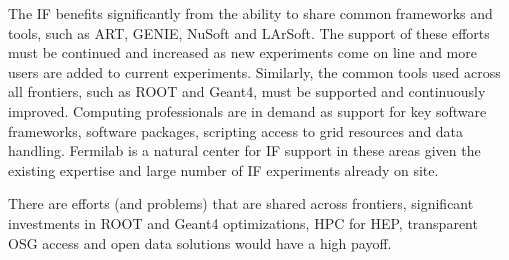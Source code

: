 The IF benefits significantly from the ability to share common frameworks and
tools, such as ART, GENIE, NuSoft and LArSoft.  The support of these efforts
must be continued and increased as new experiments come on line and more users
are added to current experiments.  Similarly, the common tools used across all
frontiers, such as ROOT and Geant4, must be supported and continuously
improved. Computing professionals are in demand as support for key software
frameworks, software packages, scripting access to grid resources and data
handling. Fermilab is a natural center for IF support in these areas given the
existing expertise and large number of IF experiments already on site.

There are efforts (and problems) that are shared across frontiers, significant
investments in ROOT and Geant4 optimizations, HPC for HEP, transparent OSG
access and open data solutions would have a high payoff.


